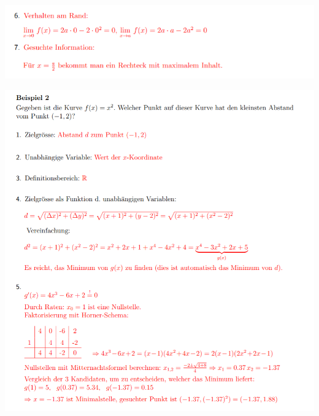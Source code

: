 \begin{center}
    \includegraphics[width=1\linewidth]{images/extrem2.png}
\end{center}
\vfill
\begin{center}
    \includegraphics[width=1\linewidth]{images/extrem3.png}
\end{center}